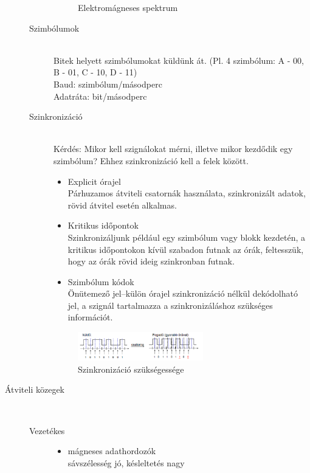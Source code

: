 \documentclass[margin=0px]{article}
\begin{document}
\begin{description}
\begin{description}
\begin{figure}[H]
							\caption{Elektromágneses spektrum}
						\end{figure}
					\item[Szimbólumok] \hfill \\
						Bitek helyett szimbólumokat küldünk át. (Pl. 4 szimbólum: A - 00, B - 01, C - 10, D - 11)\\
						Baud: szimbólum/másodperc \\
						Adatráta: bit/másodperc
					\item[Szinkronizáció] \hfill \\
						Kérdés: Mikor kell szignálokat mérni, illetve mikor kezdődik egy szimbólum? Ehhez szinkronizáció kell a felek között.
						\begin{itemize}
							\item Explicit órajel \\
								Párhuzamos átviteli csatornák használata, szinkronizált adatok, rövid átvitel esetén alkalmas.
							\item Kritikus időpontok \\
								Szinkronizáljunk például egy szimbólum vagy blokk kezdetén, a kritikus időpontokon kívül szabadon futnak az órák, feltesszük, hogy az órák rövid ideig szinkronban futnak.
							\item Szimbólum kódok \\
								Önütemező jel–külön órajel szinkronizáció nélkül dekódolható jel, a szignál tartalmazza a szinkronizáláshoz szükséges információt.
						\end{itemize}
						\begin{figure}[H]
							\centering
							\includegraphics[width=0.6\textwidth]{img/szinkronizacio.png}
							\caption{Szinkronizáció szükségessége}
						\end{figure}
				\end{description}
			\item[Átviteli közegek] \hfill \\
				\begin{description}
					\item[Vezetékes] \hfill
						\begin{itemize}
							\item mágneses adathordozók \\
							sávszélesség jó, késleltetés nagy

\end{itemize}
\end{description}
\end{description}
\end{document}
